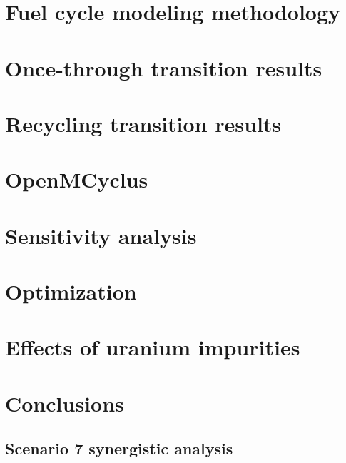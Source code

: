 \documentclass[edeposit,fullpage]{uiucthesis2018}
\begin{document}
\chapter{Fuel cycle modeling methodology} \label{ch:fc_methods}


\chapter{Once-through transition results} \label{ch:once_through_results}


\chapter{Recycling transition results} \label{ch:recycle_results}


\chapter{OpenMCyclus} \label{ch:openmcyclus}


\chapter{Sensitivity analysis} \label{ch:sa}

\chapter{Optimization}\label{ch:optimization}


\chapter{Effects of uranium impurities} \label{ch:neutronics}


\chapter{Conclusions} \label{ch:conclusions}


\begin{appendices}
\chapter{Scenario 7 synergistic analysis}\label{app:s7_synergistic}


\end{appendices}

\backmatter



\end{document}
